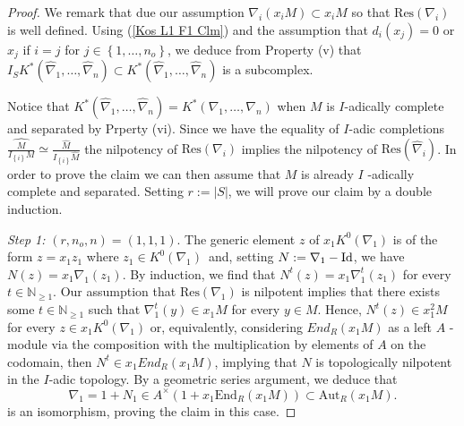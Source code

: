 \documentclass[asterisque,english]{smfart}
\begin{document}
\begin{proof} We remark that due our assumption $\nabla_i(x_i M)\subset x_i M$ so that $\mathrm{Res}(\nabla _{i})$ is well defined. Using (\ref{Kos L1 F1 Clm}) and the assumption that $ d_{i}\left( x_{j}\right) =0$ or $x_{j}$ if $i=j$ for $j\in \left\{ 1,\ldots,n_{o}\right\} $, we deduce from Property (v) that $I_{S}K^\ast\left( \widehat{\nabla }_{1},\ldots,\widehat{\nabla }
_{n}\right) \subset K^\ast\left( \widehat{\nabla }_{1},\ldots,\widehat{
\nabla }_{n}\right) $ is a subcomplex.  


Notice that  $K^\ast\left( \widehat{\nabla }_{1},\ldots,\widehat{\nabla }
_{n}\right) =K^\ast\left( \nabla _{1},\ldots,\nabla _{n}\right) $ when $M$
is $I$-adically complete and separated by Prperty (vi). Since we have the equality of $I$-adic completions $\widehat{\frac{M}{I_{\left\{
i\right\} }M}}\simeq \frac{\widehat{M}}{I_{\left\{ i\right\} } \widehat{M}}$
the nilpotency of $\mathrm{Res}\left( \nabla _{i}\right) $
implies the nilpotency of $\mathrm{Res}\left( \widehat{\nabla }_{i}\right) $. 
In order to prove the claim we can then assume that $M$ is already $I$
-adically complete and separated. Setting $r:=\left\vert S\right\vert $, we
will prove our claim by a double induction.

\emph{Step 1: }$\left( r,n_{o},n\right) =\left( 1,1,1\right) $. The generic
element $z$ of $x_{1}K^{0}\left( \nabla _{1}\right) $ is of the form $
z=x_{1}z_{1}$ where $z_{1}\in K^{0}\left( \nabla _{1}\right) $\ and, setting 
$N:=\nabla _{1}-{\rm Id}$, we have $N\left( z\right) =x_{1}\nabla _{1}\left( z_{1}\right) $. By
induction, we find that $N^{t}\left( z\right) =x_{1}\nabla _{1}^{t}\left(
z_{1}\right) $ for every $t\in \mathbb{N}_{\geq 1}$. Our assumption that $
\mathrm{Res}\left( \nabla _{1}\right) $ is nilpotent implies that there
exists some $t\in \mathbb{N}_{\geq 1}$ such that $\nabla _{1}^{t}\left(
y\right) \in x_{1}M$ for every $y\in M$. Hence, $N^{t}\left(
z\right) \in x_{1}^{2}M$ for every $z\in x_{1}K^{0}\left( \nabla _{1}\right) 
$ or, equivalently, considering $End_{R}\left( x_{1}M\right) $ as a left $A$
-module via the composition with the multiplication by elements of $A$ on
the codomain, then $N^{t}\in
x_{1}End_{R}\left( x_{1}M\right) $, implying that $N$ is topologically
nilpotent in the $I$-adic topology. By a geometric series argument, we deduce that
\begin{equation*}
\nabla _{1}=1+ N_1\in A^{\times }\left( 1+ x_1 \mathrm{End}_{R}\left(
x_{1}M\right) \right) \subset \mathrm{Aut}_{R}\left( x_{1}M\right) \text{.}
\end{equation*}
is an isomorphism, proving the claim in this case.


\end{proof}
\end{document}
